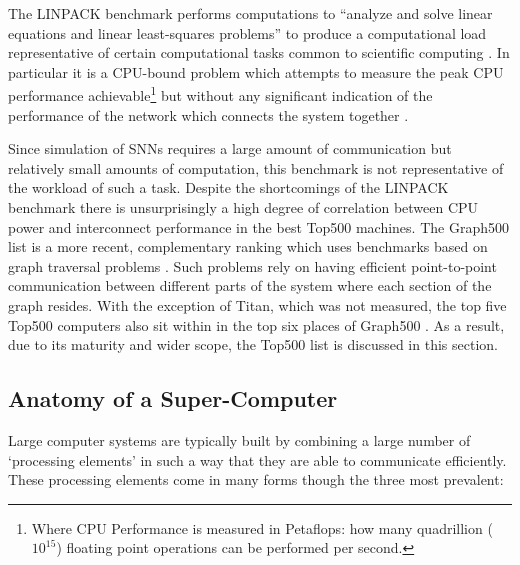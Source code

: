 		The LINPACK benchmark performs computations to ``analyze and solve linear
		equations and linear least-squares problems'' to produce a computational
		load representative of certain computational tasks common to scientific
		computing \cite{dongarra84}. In particular it is a CPU-bound problem which
		attempts to measure the peak CPU performance achievable\footnote{Where CPU
		Performance is measured in Petaflops: how many quadrillion ($10^{15}$)
		floating point operations can be performed per second.} but without any
		significant indication of the performance of the network which connects the
		system together \cite{dongarra07}.
		
		Since simulation of SNNs requires a large amount of communication but
		relatively small amounts of computation, this benchmark is not
		representative of the workload of such a task. Despite the shortcomings of
		the LINPACK benchmark there is unsurprisingly a high degree of correlation
		between CPU power and interconnect performance in the best Top500 machines.
		The Graph500 list is a more recent, complementary ranking which uses
		benchmarks based on graph traversal problems \cite{murphy10}. Such problems
		rely on having efficient point-to-point communication between different
		parts of the system where each section of the graph resides. With the
		exception of Titan, which was not measured, the top five Top500 computers
		also sit within in the top six places of Graph500 \cite{murphy13}. As a
		result, due to its maturity and wider scope, the Top500 list is discussed in
		this section.
		
		\subsection{Anatomy of a Super-Computer}
			
			
			Large computer systems are typically built by combining a large number of
			`processing elements' in such a way that they are able to communicate
			efficiently. These processing elements come in many forms though the three
			most prevalent:
			
